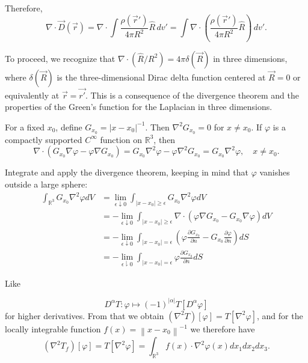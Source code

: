 \documentclass[12pt]{article}
\begin{document}
Therefore,
\[
\nabla \cdot \vec{D}(\vec{r}) = \nabla \cdot \int \frac{\rho(\vec{r}')}{4 \pi R^2} \hat{R} \, dv' = \int \nabla \cdot \left(\frac{\rho(\vec{r}')}{4 \pi R^2} \hat{R}\right) \, dv'.
\]

\hline

To proceed, we recognize that \(\nabla \cdot (\hat{R}/R^2) = 4\pi \delta(\vec{R})\) in three dimensions, where \(\delta(\vec{R})\) is the three-dimensional Dirac delta function centered at \(\vec{R} = 0\) or equivalently at \(\vec{r} = \vec{r'}\). This is a consequence of the divergence theorem and the properties of the Green's function for the Laplacian in three dimensions.


For a fixed \(x_0\), define \(G_{x_0}=\left|x-x_0\right|^{-1}\). Then \(\nabla^2 G_{x_0}=0\) for \(x \neq x_0\). If \(\varphi\) is a compactly supported \(C^{\infty}\) function on \(\mathbb{R}^3\), then
\[
\nabla \cdot\left(G_{x_0} \nabla \varphi-\varphi \nabla G_{x_0}\right)=G_{x_0} \nabla^2 \varphi-\varphi \nabla^2 G_{x_0}=G_{x_0} \nabla^2 \varphi, \quad x \neq x_0 .
\]

Integrate and apply the divergence theorem, keeping in mind that \(\varphi\) vanishes outside a large sphere:
\[
\begin{aligned}
\int_{\mathbb{R}^3} G_{x_0} \nabla^2 \varphi d V & =\lim _{\epsilon \downarrow 0} \int_{\left|x-x_0\right| \geq \epsilon} G_{x_0} \nabla^2 \varphi d V \\
& =-\lim _{\epsilon \downarrow 0} \int_{\left|x-x_0\right| \geq \epsilon} \nabla \cdot\left(\varphi \nabla G_{x_0}-G_{x_0} \nabla \varphi\right) d V \\
& =-\lim _{\epsilon \downarrow 0} \int_{\left|x-x_0\right|=\epsilon}\left(\varphi \frac{\partial G_{x_0}}{\partial n}-G_{x_0} \frac{\partial \varphi}{\partial n}\right) d S \\
& =-\lim _{\epsilon \downharpoonright 0} \int_{\left|x-x_0\right|=\epsilon} \varphi \frac{\partial G_{x_0}}{\partial n} d S
\end{aligned}
\]

Like

\[
D^\alpha T: \varphi \mapsto(-1)^{|\alpha|} T\left[D^\alpha \varphi\right]
\]
for higher derivatives.
From that we obtain \(\left(\nabla^2 T\right)[\varphi]=T\left[\nabla^2 \varphi\right]\), and for the locally integrable function \(f(x)=\left\|x-x_0\right\|^{-1}\) we therefore have
\[
\left(\nabla^2 T_f\right)[\varphi]=T\left[\nabla^2 \varphi\right]=\int_{\mathbb{R}^3} f(x) \cdot \nabla^2 \varphi(x) d x_1 d x_2 d x_3 .
\]
\end{document}
